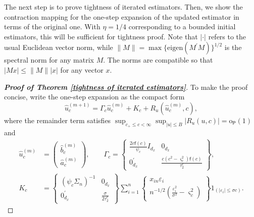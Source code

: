 \documentclass[11pt, letterpaper]{article}
\numberwithin{algorithm}{section}
\numberwithin{assumption}{section}
\numberwithin{lemma}{section}
\numberwithin{theorem}{section}
\numberwithin{corollary}{section}
\numberwithin{remark}{section}
\numberwithin{equation}{section}
\numberwithin{figure}{section}
\numberwithin{table}{section}
\begin{document}
The next step is to prove tightness of iterated estimators. Then, we show the contraction mapping for the one-step expansion of the updated estimator in terms of the original one. With $\eta = 1/4$ corresponding to a bounded initial estimators, this will be sufficient for tightness proof. Note that $|\cdot|$ refers to the usual Euclidean vector norm, while $\| M \| = \max \{ \mathrm{eigen}(M^{\prime}M) \}^{1/2}$ is the spectral norm for any matrix $M$. The norms are compatible so that $|Mx| \le \| M \| |x|$ for any vector $x$.

\begin{proof}[\textnormal{\textbf{Proof of Theorem \ref{tightness of iterated estimators}}}]
To make the proof concise, write the one-step expansion as the compact form
\begin{equation} \label{autoregressive equation for u with 0 remainder term allows the varying cut-off c}
\widehat{u}_{c}^{(m+1)} = \Gamma_{c} \widehat{u}_{c}^{(m)} + K_{c} + R_{u}(\widehat{u}_{c}^{(m)}, c),
\end{equation}
where the remainder term satisfies $\sup_{c_{+} \le c < \infty} \sup_{|u| \le B} |R_{u}(u, c)| = \mathrm{o}_{\mathsf{P}}(1)$ and
\begin{align}
\widehat{u}_{c}^{(m)} & =
                                          \begin{pmatrix}
                                          \widehat{b}_{c}^{(m)} \\
                                          \widehat{a}_{c}^{(m)}
                                          \end{pmatrix}
, \qquad
\Gamma_{c} =
                         \begin{Bmatrix}
                         \frac{2c\mathsf{f}(c)}{\psi_{c}} I_{d_{x}} & 0_{d_{x}} \\
                         0_{d_{x}}^{\prime} & \frac{c(c^{2} - \varsigma_{c}^{2})\mathsf{f}(c)}{\tau_{2}^{c}}
                         \end{Bmatrix}, \label{estimation error u and autoregressive coefficient with the same c}
                         \\
K_{c} & =
               \begin{Bmatrix}
               (\psi_{c} \Sigma_{n})^{-1} & 0_{d_{x}} \\
               0_{d_{x}}^{\prime} & \frac{\sigma}{2 \tau_{2}^{c}}
               \end{Bmatrix}
\sum_{i=1}^{n}
                            \begin{Bmatrix}
                            x_{in} \varepsilon_{i} \\
                            n^{-1/2} (\frac{\varepsilon_{i}^{2}}{\sigma^{2}} - \varsigma_{c}^{2})
                            \end{Bmatrix}
1_{(|\varepsilon_{i}| \le \sigma c)}. \label{kernel with the same c}
\end{align}


\end{proof}
\end{document}
